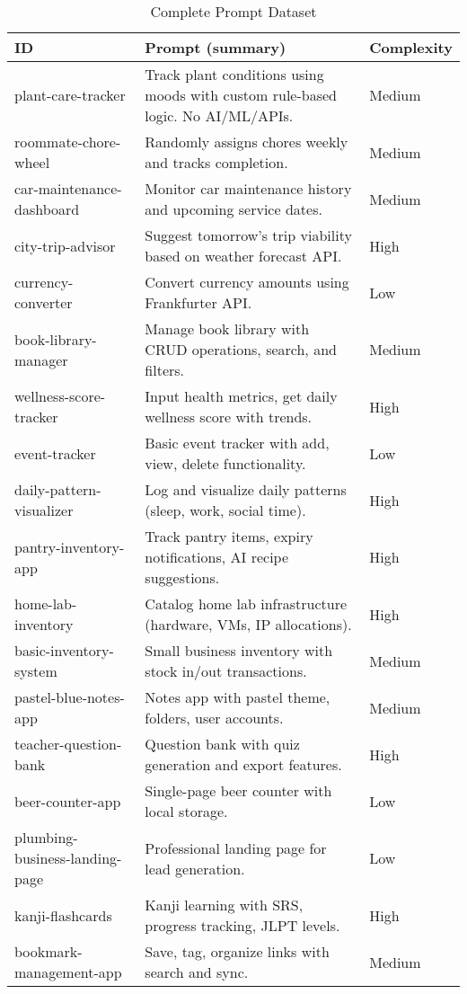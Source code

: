 \documentclass{article}
\begin{document}
\begin{table}[h]
\caption{Complete Prompt Dataset}
\label{tab:prompt-dataset}
\centering
\scriptsize
\begin{tabular}{p{3cm}p{8cm}p{1.5cm}}
\toprule
ID & Prompt (summary) & Complexity \\
\midrule
plant-care-tracker & Track plant conditions using moods with custom rule-based logic. No AI/ML/APIs. & Medium \\
roommate-chore-wheel & Randomly assigns chores weekly and tracks completion. & Medium \\
car-maintenance-dashboard & Monitor car maintenance history and upcoming service dates. & Medium \\
city-trip-advisor & Suggest tomorrow's trip viability based on weather forecast API. & High \\
currency-converter & Convert currency amounts using Frankfurter API. & Low \\
book-library-manager & Manage book library with CRUD operations, search, and filters. & Medium \\
wellness-score-tracker & Input health metrics, get daily wellness score with trends. & High \\
event-tracker & Basic event tracker with add, view, delete functionality. & Low \\
daily-pattern-visualizer & Log and visualize daily patterns (sleep, work, social time). & High \\
pantry-inventory-app & Track pantry items, expiry notifications, AI recipe suggestions. & High \\
home-lab-inventory & Catalog home lab infrastructure (hardware, VMs, IP allocations). & High \\
basic-inventory-system & Small business inventory with stock in/out transactions. & Medium \\
pastel-blue-notes-app & Notes app with pastel theme, folders, user accounts. & Medium \\
teacher-question-bank & Question bank with quiz generation and export features. & High \\
beer-counter-app & Single-page beer counter with local storage. & Low \\
plumbing-business-landing-page & Professional landing page for lead generation. & Low \\
kanji-flashcards & Kanji learning with SRS, progress tracking, JLPT levels. & High \\
bookmark-management-app & Save, tag, organize links with search and sync. & Medium \\

\end{tabular}
\end{table}
\end{document}
